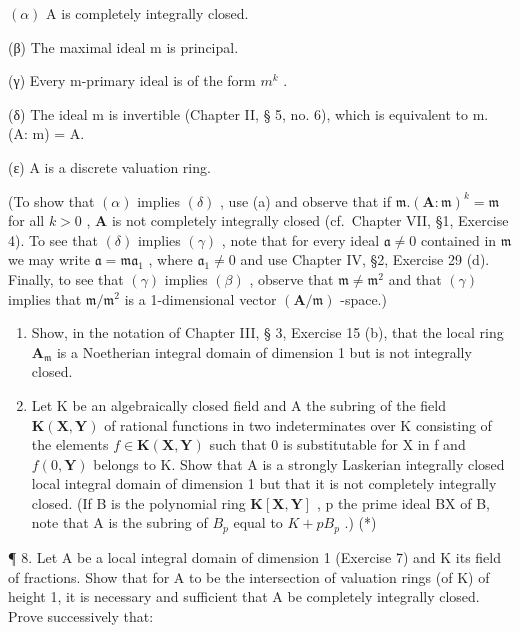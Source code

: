 \((\alpha)\) A is completely integrally closed.

(β) The maximal ideal m is principal.

(γ) Every m-primary ideal is of the form \(m^{k}\) .

(δ) The ideal m is invertible (Chapter II, § 5, no. 6), which is equivalent to m. (A: m) = A.

(ε) A is a discrete valuation ring.

(To show that \((\alpha)\) implies \((\delta)\) , use (a) and observe that if \(\mathfrak{m}.\left(\mathbf{A}:\mathfrak{m}\right)^k = \mathfrak{m}\) for all \(k > 0\) , \(\mathbf{A}\) is not completely integrally closed (cf.~Chapter VII, §1, Exercise 4). To see that \((\delta)\) implies \((\gamma)\) , note that for every ideal \(\mathfrak{a} \neq 0\) contained in \(\mathfrak{m}\) we may write \(\mathfrak{a} = \mathfrak{ma}_1\) , where \(\mathfrak{a}_1 \neq 0\) and use Chapter IV, §2, Exercise 29 (d). Finally, to see that \((\gamma)\) implies \((\beta)\) , observe that \(\mathfrak{m} \neq \mathfrak{m}^2\) and that \((\gamma)\) implies that \(\mathfrak{m} / \mathfrak{m}^2\) is a 1-dimensional vector \((\mathbf{A} / \mathfrak{m})\) -space.)

\begin{enumerate}
\def\labelenumi{(\alph{enumi})}
\setcounter{enumi}{2}
\item
  Show, in the notation of Chapter III, § 3, Exercise 15 (b), that the local ring \(\mathbf{A}_{\mathfrak{m}}\) is a Noetherian integral domain of dimension 1 but is not integrally closed.
\item
  Let K be an algebraically closed field and A the subring of the field \(\mathbf{K}(\mathbf{X},\mathbf{Y})\) of rational functions in two indeterminates over K consisting of the elements \(f\in\mathbf{K}(\mathbf{X},\mathbf{Y})\) such that 0 is substitutable for X in f and \(f(0,\mathbf{Y})\) belongs to K. Show that A is a strongly Laskerian integrally closed local integral domain of dimension 1 but that it is not completely integrally closed. (If B is the polynomial ring \(\mathbf{K}[\mathbf{X},\mathbf{Y}]\) , p the prime ideal BX of B, note that A is the subring of \(B_{p}\) equal to \(K+pB_{p}\) .) (*)
\end{enumerate}

¶ 8. Let A be a local integral domain of dimension 1 (Exercise 7) and K its field of fractions. Show that for A to be the intersection of valuation rings (of K) of height 1, it is necessary and sufficient that A be completely integrally closed. Prove successively that:

